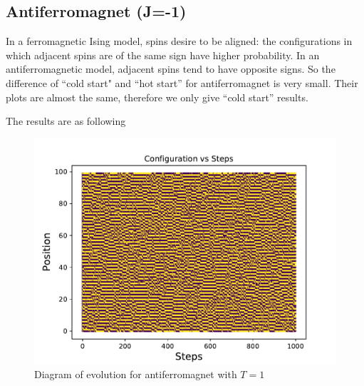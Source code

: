 \documentclass[12pt]{article}
\begin{document}
	\subsection{Antiferromagnet (J=-1)}
	\label{sec: results of antiferromagnet}
	In a ferromagnetic Ising model, spins desire to be aligned: the configurations in which adjacent spins are of the same sign have higher probability. In an antiferromagnetic model, adjacent spins tend to have opposite signs.  So the difference of ``cold start" and ``hot start'' for antiferromagnet is very small. Their plots are almost the same, therefore we only give ``cold start'' results.
	
	The results are as following 
	\begin{figure}[H]
		\centering
		\includegraphics{configuration (J=-1,N=100,Low,T=1).pdf}
		\caption{Diagram of  evolution for antiferromagnet with $T=1$}
		\label{fig: evolution of antiferromagnet low start}
	\end{figure}
	
\end{document}
